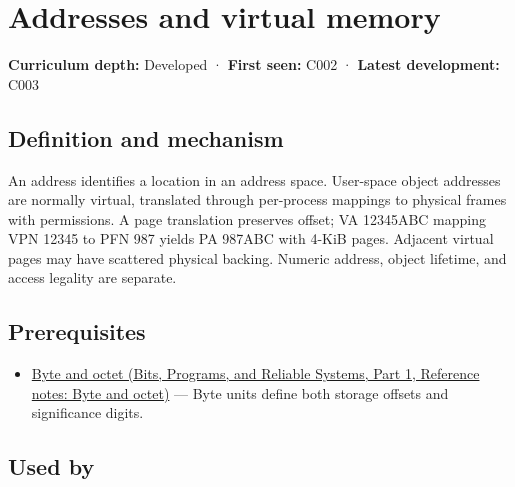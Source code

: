 \hypertarget{appendix-18ee4f913c3c}{}\label{referencestart:appendix-18ee4f913c3c}
\section{Addresses and virtual memory}\label{appendix-18ee4f913c3c-addresses-and-virtual-memory}

\hypertarget{appendix-18ee4f913c3c-addresses-and-virtual-memory}{}

\textbf{Curriculum depth:} Developed · \textbf{First seen:} C002 · \textbf{Latest development:} C003

\begin{allmightroledefinition}

\subsection{Definition and mechanism}\label{appendix-18ee4f913c3c-definition-and-mechanism}

\hypertarget{appendix-18ee4f913c3c-definition-and-mechanism}{}

An address identifies a location in an address space. User-space object addresses are normally virtual, translated through per-process mappings to physical frames with permissions. A page translation preserves offset; VA 12345ABC mapping VPN 12345 to PFN 987 yields PA 987ABC with 4-KiB pages. Adjacent virtual pages may have scattered physical backing. Numeric address, object lifetime, and access legality are separate.

\end{allmightroledefinition}

\subsection{Prerequisites}\label{appendix-18ee4f913c3c-prerequisites}

\hypertarget{appendix-18ee4f913c3c-prerequisites}{}

\begin{itemize}
\tightlist
\item
  \href{../01-Bits-Programs-and-Reliable-Systems-P01/main.pdf\#appendix-5bee2df85484}{Byte and octet (Bits, Programs, and Reliable Systems, Part 1, Reference notes: Byte and octet)} --- Byte units define both storage offsets and significance digits.
\end{itemize}

\subsection{Used by}\label{appendix-18ee4f913c3c-used-by}

